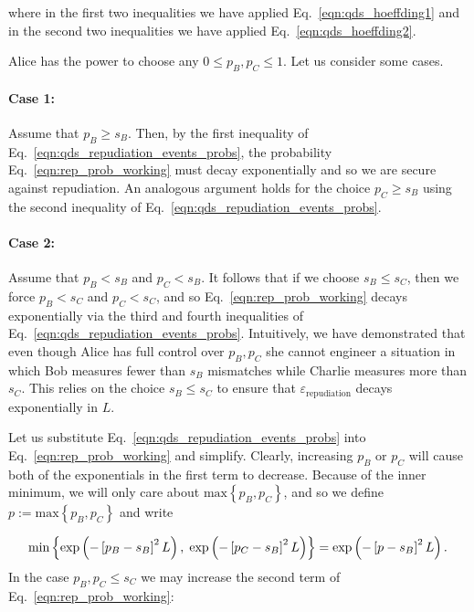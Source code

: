 \noindent where in the first two inequalities we have applied Eq.~\ref{eqn:qds_hoeffding1} and in the second two inequalities we have applied Eq.~\ref{eqn:qds_hoeffding2}. 

Alice has the power to choose any $0 \le p_B, p_C \le 1$. Let us consider some cases.

\paragraph{Case 1:} Assume that $p_B \ge s_B$. Then, by the first inequality of Eq.~\ref{eqn:qds_repudiation_events_probs}, the probability Eq.~\ref{eqn:rep_prob_working} must decay exponentially %
and so we are secure against repudiation. An analogous argument holds for the choice $p_C \ge s_B$ using the second inequality of Eq.~\ref{eqn:qds_repudiation_events_probs}.

\paragraph{Case 2:} Assume that $p_B < s_B$ and $p_C < s_B$. It follows that if we choose $s_B \le s_C$, then we force $p_B < s_C$ and $p_C < s_C$, and so Eq.~\ref{eqn:rep_prob_working} decays exponentially via the third and fourth inequalities of Eq.~\ref{eqn:qds_repudiation_events_probs}. Intuitively, we have demonstrated that even though Alice has full control over $p_B, p_C$ she cannot engineer a situation in which Bob measures fewer than $s_B$ mismatches while Charlie measures more than $s_C$. This relies on the choice $s_B \le s_C$ to ensure that $\varepsilon_{\text{repudiation}}$ decays exponentially in $L$.


Let us substitute Eq.~\ref{eqn:qds_repudiation_events_probs} into Eq.~\ref{eqn:rep_prob_working} and simplify. Clearly, increasing $p_B$ or $p_C$ will cause both of the exponentials in the first term to decrease. Because of the inner minimum, we will only care about $\text{max}\left\{p_B, p_C\right\}$, and so we define $p := \text{max}\left\{p_B, p_C\right\}$ and write

\begin{equation}
\text{min}\left\{\text{exp}\left(- \left[p_B - s_B\right]^2L\right), \; \text{exp}\left(- \left[p_C - s_B\right]^2L\right)\right\} = \text{exp}\left(-\left[p - s_B\right]^2L\right). \notag
\end{equation}
In the case $p_B, p_C \le s_C$ we may increase the second term of Eq.~\ref{eqn:rep_prob_working}:

